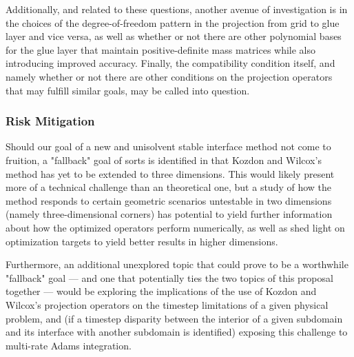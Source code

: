 Additionally, and related to these questions, another avenue of investigation
is in the choices of the degree-of-freedom pattern in the projection from
grid to glue layer and vice versa, as well as whether or not there are other
polynomial bases for the glue layer that maintain positive-definite mass
matrices while also introducing improved accuracy. Finally, the compatibility
condition itself, and namely whether or not there are other conditions on the
projection operators that may fulfill similar goals, may be called into question.

\subsubsection{Risk Mitigation}

Should our goal of a new and unisolvent stable interface method not come to
fruition, a "fallback" goal of sorts is identified in that Kozdon and Wilcox's
method has yet to be extended to three dimensions. This would likely present more of a
technical challenge than an theoretical one, but a study of how the method
responds to certain geometric scenarios untestable in two dimensions (namely
three-dimensional corners) has potential to yield further information about
how the optimized operators perform numerically, as well as shed light on
optimization targets to yield better results in higher dimensions.

Furthermore, an additional unexplored topic that could prove to be a worthwhile
"fallback" goal --- and one that potentially ties the two topics of this proposal
together --- would be exploring the implications of the use of Kozdon and Wilcox's
projection operators on the timestep limitations of a given physical problem, and
(if a timestep disparity between the interior of a given subdomain and its interface
with another subdomain is identified) exposing this challenge to multi-rate Adams
integration.

